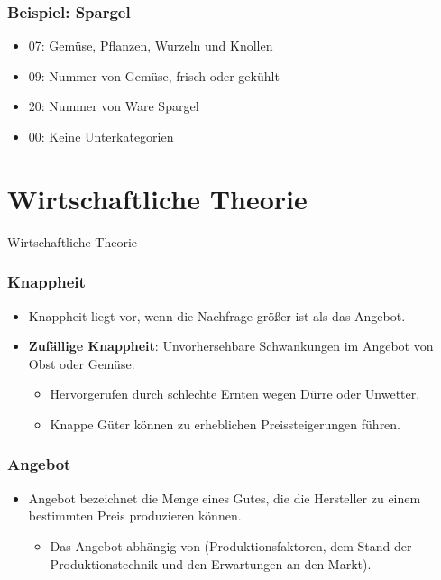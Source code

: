 \documentclass{beamer}
\begin{document}
\begin{frame}
\frametitle{Beispiel: Spargel}
      \begin{itemize}
        \item
07: Gemüse, Pflanzen, Wurzeln und Knollen
        \item
09: Nummer von Gemüse, frisch oder gekühlt
        \item
20: Nummer von Ware Spargel
        \item
00: Keine Unterkategorien
      \end{itemize}
\end{frame}

\section{Wirtschaftliche Theorie} %
\begin{frame}
	\begin{center}
		{\Huge Wirtschaftliche Theorie}
	\end{center}
\end{frame}

\begin{frame}
\frametitle{Knappheit}
  \begin{itemize}
    \item
  Knappheit liegt vor, wenn die Nachfrage größer ist als
  das Angebot.
    \item
      \textbf{Zufällige Knappheit}: Unvorhersehbare Schwankungen
  im Angebot von Obst oder Gemüse.
      \begin{itemize}
        \item
  Hervorgerufen durch schlechte Ernten wegen Dürre oder
  Unwetter.
\item
Knappe Güter können zu erheblichen Preissteigerungen führen.
  \end{itemize}
      \end{itemize}
\end{frame}

\begin{frame}
\frametitle{Angebot}
  \begin{itemize}
    \item
Angebot bezeichnet die Menge eines Gutes, die die
Hersteller zu einem bestimmten Preis produzieren
können.
      \begin{itemize}
        \item
  Das Angebot abhängig von (Produktionsfaktoren, dem Stand
  der Produktionstechnik und den Erwartungen an den Markt).
      \end{itemize}
  \end{itemize}
\end{frame}
\end{document}
